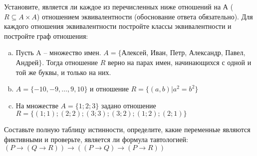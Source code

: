 \documentclass[10pt]{exam}
\begin{document}
\begin{questions}
\question
Установите, является ли каждое из перечисленных ниже отношений на А ($R \subseteq A \times A$) отношением эквивалентности (обоснование ответа обязательно). Для каждого отношения эквивалентности постройте классы 
эквивалентности и постройте граф отношения:
\begin{enumerate} [a)]\setcounter{enumi}{0}
\item Пусть A – множество имен. $A = \{ $Алексей, Иван, Петр, Александр, Павел, Андрей$ \}$. Тогда отношение $R$ верно на парах имен, начинающихся с одной и той же буквы, и только на них.
\item $A = \{-10, -9, … , 9, 10\}$ и отношение $ R = \{(a,b)|a^{2} = b^{2}\}$
\item На множестве $A = \{1; 2; 3\}$ задано отношение $R = \{(1; 1); (2; 2); (3; 3); (3; 2); (1; 2); (2; 1)\}$
\end{enumerate}\question Составьте полную таблицу истинности, определите, какие переменные являются фиктивными и проверьте, является ли формула тавтологией:
$(P \rightarrow (Q \rightarrow R)) \rightarrow ((P \rightarrow Q) \rightarrow (P \rightarrow R))$

\end{questions}
\newpage
\end{document}
